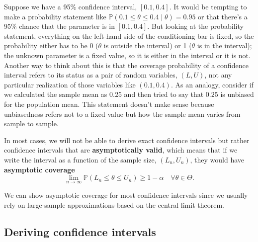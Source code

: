 \documentclass[
  letterpaper,
  DIV=11,
  numbers=noendperiod]{scrreprt}
\renewcommand{\P}{\mathbb{P}}
\theoremstyle{plain}
\theoremstyle{definition}
\theoremstyle{definition}
\theoremstyle{remark}
\begin{document}
\begin{tcolorbox}[enhanced jigsaw, opacityback=0, breakable, bottomtitle=1mm, opacitybacktitle=0.6, coltitle=black, leftrule=.75mm, toptitle=1mm, colback=white, titlerule=0mm, colframe=quarto-callout-warning-color-frame, rightrule=.15mm, bottomrule=.15mm, toprule=.15mm, title=\textcolor{quarto-callout-warning-color}{\faExclamationTriangle}\hspace{0.5em}{Warning}, left=2mm, arc=.35mm, colbacktitle=quarto-callout-warning-color!10!white]

Suppose we have a 95\% confidence interval, \([0.1, 0.4]\). It would be
tempting to make a probability statement like
\(\P(0.1 \leq \theta \leq 0.4 \mid \theta) = 0.95\) or that there's a
95\% chance that the parameter is in \([0.1, 0.4]\). But looking at the
probability statement, everything on the left-hand side of the
conditioning bar is fixed, so the probability either has to be 0
(\(\theta\) is outside the interval) or 1 (\(\theta\) is in the
interval); the unknown parameter is a fixed value, so it is either in
the interval or it is not. Another way to think about this is that the
coverage probability of a confidence interval refers to its status as a
pair of random variables, \((L, U)\), not any particular realization of
those variables like \((0.1, 0.4)\). As an analogy, consider if we
calculated the sample mean as \(0.25\) and then tried to say that
\(0.25\) is unbiased for the population mean. This statement doesn't
make sense because unbiasedness refers not to a fixed value but how the
sample mean varies from sample to sample.

\end{tcolorbox}

In most cases, we will not be able to derive exact confidence intervals
but rather confidence intervals that are \textbf{asymptotically valid},
which means that if we write the interval as a function of the sample
size, \((L_n, U_n)\), they would have \textbf{asymptotic coverage} \[
\lim_{n\to\infty} \P(L_n \leq \theta \leq U_n) \geq 1-\alpha \quad\forall\theta\in\Theta.
\]

We can show asymptotic coverage for most confidence intervals since we
usually rely on large-sample approximations based on the central limit
theorem.

\hypertarget{deriving-confidence-intervals}{%
\subsection{Deriving confidence
intervals}\label{deriving-confidence-intervals}}
\end{document}
